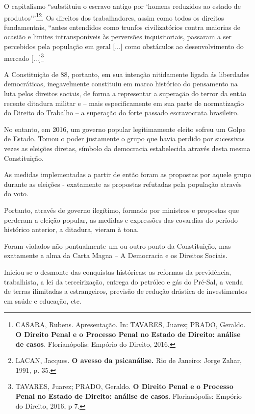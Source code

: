 O capitalismo ``substituiu o escravo antigo por `homens reduzidos ao
estado de produtos'''\footnote{CASARA, Rubens. Apresentação. In:
  TAVARES, Juarez; PRADO, Geraldo. \textbf{O Direito Penal e o Processo
  Penal no Estado de Direito: análise de casos}. Florianópolis: Empório
  do Direito, 2016.}\footnote{LACAN, Jacques. \textbf{O avesso da
  psicanálise.} Rio de Janeiro: Jorge Zahar, 1991, p. 35.}. Os direitos
dos trabalhadores, assim como todos os direitos fundamentais, ``antes
entendidos como trunfos civilizatórios contra maiorias de ocasião e
limites intransponíveis às perversões inquisitoriais, passaram a ser
percebidos pela população em geral {[}...{]} como obstáculos ao
desenvolvimento do mercado {[}...{]}\footnote{TAVARES, Juarez; PRADO,
  Geraldo. \textbf{O Direito Penal e o Processo Penal no Estado de
  Direito: análise de casos}. Florianópolis: Empório do Direito, 2016, p
  7.}

A Constituição de 88, portanto, em sua intenção nitidamente ligada ás
liberdades democráticas, inegavelmente constituiu em marco histórico do
pensamento na luta pelos direitos sociais, de forma a representar a
superação do terror da então recente ditadura militar e -- mais
especificamente em sua parte de normatização do Direito do Trabalho -- a
superação do forte passado escravocrata brasileiro.

No entanto, em 2016, um governo popular legitimamente eleito sofreu um
Golpe de Estado. Tomou o poder justamente o grupo que havia perdido por
sucessivas vezes as eleições diretas, símbolo da democracia estabelecida
através desta mesma Constituição.

As medidas implementadas a partir de então foram as propostas por aquele
grupo durante as eleições - exatamente as propostas refutadas pela
população através do voto.

Portanto, através de governo ilegítimo, formado por ministros e
propostas que perderam a eleição popular, as medidas e expressões das
covardias do período histórico anterior, a ditadura, vieram à tona.

Foram violados não pontualmente um ou outro ponto da Constituição, mas
exatamente a alma da Carta Magna -- A Democracia e os Direitos Sociais.

Iniciou-se o desmonte das conquistas históricas: as reformas da
previdência, trabalhista, a lei da terceirização, entrega do petróleo e
gás do Pré-Sal, a venda de terras ilimitadas a estrangeiros, previsão de
redução drástica de investimentos em saúde e educação, etc.

